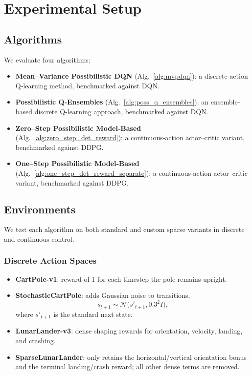 \documentclass[11pt,a4paper]{report}
\begin{document}
\chapter{Experimental Setup}
\label{chapter:es}

\section{Algorithms}
We evaluate four algorithms:

\begin{itemize}
  \item \textbf{Mean–Variance Possibilistic DQN} (Alg.~\ref{alg:mvpdqn}): a discrete‐action Q‐learning method, benchmarked against DQN.
  \item \textbf{Possibilistic Q‐Ensembles} (Alg.~\ref{alg:poss_q_ensembles}): an ensemble‐based discrete Q‐learning approach, benchmarked against DQN.
  \item \textbf{Zero–Step Possibilistic Model‐Based} (Alg.~\ref{alg:zero_step_det_reward}): a continuous‐action actor–critic variant, benchmarked against DDPG.
  \item \textbf{One–Step Possibilistic Model‐Based} (Alg.~\ref{alg:one_step_det_reward_separate}): a continuous‐action actor–critic variant, benchmarked against DDPG.
\end{itemize}

\section{Environments}
We test each algorithm on both standard and custom sparse variants in discrete and continuous control.

\subsection{Discrete Action Spaces}
\begin{itemize}
  \item \textbf{CartPole-v1}: reward of 1 for each timestep the pole remains upright.
  \item \textbf{StochasticCartPole}: adds Gaussian noise to transitions,
    \[
      s_{t+1} \sim \mathcal{N}\bigl(s'_{t+1}, 0.3^2 I\bigr),
    \]
    where \(s'_{t+1}\) is the standard next state.
  \item \textbf{LunarLander-v3}: dense shaping rewards for orientation, velocity, landing, and crashing.
  \item \textbf{SparseLunarLander}: only retains the horizontal/vertical orientation bonus and the terminal landing/crash reward; all other dense terms are removed.
\end{itemize}
\end{document}
